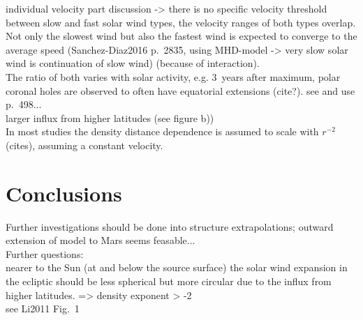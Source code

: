 individual velocity part discussion -> there is no specific velocity threshold between slow and fast solar wind types, the velocity ranges of both types overlap.\\
Not only the slowest wind but also the fastest wind is expected to converge to the average speed (Sanchez-Diaz2016 p.~2835, using MHD-model -> very slow solar wind is continuation of slow wind) (because of interaction).\\

The ratio of both varies with solar activity, e.g. 3~years after maximum, polar coronal holes are observed to often have equatorial extensions (cite?). see and use \citet{Bougeret1984} p.~498...\\

larger influx from higher latitudes (see figure b))\\

In most studies the density distance dependence is assumed to scale with $r^{-2}$ (cites), assuming a constant velocity.\\


\section{Conclusions}

Further investigations should be done into structure extrapolations; outward extension of model to Mars seems feasable...\\

Further questions:\\
nearer to the Sun (at and below the source surface) the solar wind expansion in the ecliptic should be less spherical but more circular due to the influx from higher latitudes. => density exponent > -2\\
see Li2011 Fig.~1\\


